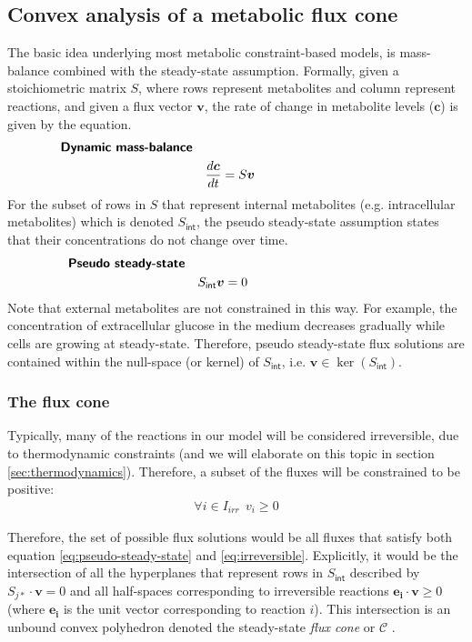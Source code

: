 \documentclass[10pt,a4paper]{article}
\newcommand{\mymatrix}[1]{#1}
\newcommand{\myvector}[1]{{\boldsymbol{#1}}}
\newcommand{\fluxcone}{\mathcal{C}}
\newcommand{\stoichmat}{\mymatrix{S}}
\newcommand{\stoichmatint}{\mymatrix{S}_{\mathsf{int}}}
\begin{document}
\subsection{Convex analysis of a metabolic flux cone}
The basic idea underlying most metabolic constraint-based models, is mass-balance combined with the steady-state assumption. Formally, given a stoichiometric matrix $\mymatrix{S}$, where rows represent metabolites and column represent reactions, and given a flux vector $\myvector{v}$, the rate of change in metabolite levels ($\myvector{c}$) is given by the equation.
\begin{eqnarray}\label{eq:dynamic-mass-balance}
	&\textsf{\textbf{Dynamic mass-balance}} &\nonumber\\
    &&\frac{d\myvector{c}}{dt} = \stoichmat \myvector{v}~~~~~~~~~~~~~~~~~~~~~~~~~~~~~~~~~~~~~
\end{eqnarray}
For the subset of rows in $\stoichmat$ that represent internal metabolites (e.g. intracellular metabolites) which is denoted $\stoichmatint$, the pseudo steady-state assumption states that their concentrations do not change over time.
\begin{eqnarray}\label{eq:pseudo-steady-state}
	&\textsf{\textbf{Pseudo steady-state}} &\nonumber\\
	&&\stoichmatint \myvector{v} = 0~~~~~~~~~~~~~~~~~~~~~~~~~~~~~~~~~~~~~
\end{eqnarray}
Note that external metabolites are not constrained in this way. For example, the concentration of extracellular glucose in the medium decreases gradually while cells are growing at steady-state. Therefore, pseudo steady-state flux solutions are contained within the null-space (or kernel) of $\stoichmatint$, i.e. $\myvector{v} \in \ker(\stoichmatint)$.

\subsubsection{The flux cone}
Typically, many of the reactions in our model will be considered irreversible, due to thermodynamic constraints (and we will elaborate on this topic in section \ref{sec:thermodynamics}). Therefore, a subset of the fluxes will be constrained to be positive:
\begin{eqnarray}\label{eq:irreversible}
\forall i \in I_{irr} ~~ v_i \geq 0
\end{eqnarray}

Therefore, the set of possible flux solutions would be all fluxes that satisfy both equation \ref{eq:pseudo-steady-state} and \ref{eq:irreversible}. Explicitly, it would be the intersection of all the hyperplanes that represent rows in $\stoichmatint$ described by $S_{j*}\cdot \myvector{v} = 0$ and all half-spaces corresponding to irreversible reactions $\myvector{e_i} \cdot \myvector{v} \geq 0$ (where $\myvector{e_i}$ is the unit vector corresponding to reaction $i$). This intersection is an unbound convex polyhedron denoted the steady-state \emph{flux cone} or $\fluxcone$ \cite{marashi_analysis_2012}.
	
\end{document}

